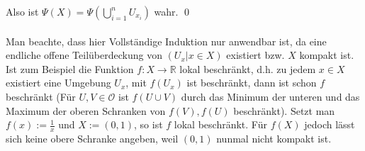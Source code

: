 	Also ist \(\Psi(X) =  \Psi(\bigcup_{i=1}^{n} U_{x_i})\) wahr.
\qed
\\
\\
Man beachte, dass hier Vollständige Induktion nur anwendbar ist, da eine endliche offene Teilüberdeckung von \( (U_x | x \in X) \) existiert bzw. \(X\) kompakt ist.
Ist zum Beispiel die Funktion \(f : X \to \mathbb{R}\) lokal beschränkt, d.h. zu jedem \(x \in X\) existiert eine Umgebung \(U_x\), mit \(f(U_x)\) ist beschränkt, 
dann ist schon \(f\) beschränkt (Für \(U,V \in \mathcal{O}\) ist \(f(U \cup V)\) durch das Minimum der unteren und das Maximum der oberen 
Schranken von \(f(V), f(U)\) beschränkt). Setzt man \(f(x):=\frac{1}{x}\) und \(X:=(0,1)\), so ist \(f\) lokal beschränkt.
Für \(f(X)\) jedoch lässt sich keine obere Schranke angeben, weil \((0,1)\) nunmal nicht kompakt ist.


